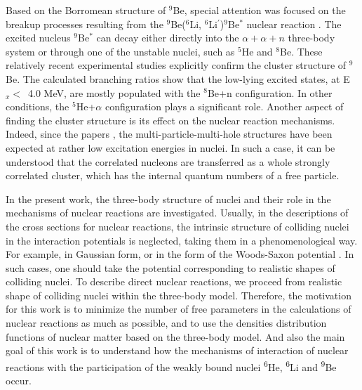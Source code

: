 \documentclass[
12pt, %
oneside, %
english, %
onehalfspacing, %
onehalfspacing, %
headsepline, %
]{MastersDoctoralThesis} %
\newcommand{\he}{\textsuperscript{6}He\xspace}
\newcommand{\li}{\textsuperscript{6}Li\xspace}
\newcommand{\be}{\textsuperscript{9}Be\xspace}
\begin{document}
Based on the Borromean structure of ${}^9$Be, special attention was focused on the breakup processes resulting from the ${}^9$Be($^6$Li, ${}^6$Li$^\prime$)$^9$Be$^*$ nuclear reaction \cite{brown2007, papka2007}. The excited nucleus ${}^9$Be$^*$ can decay either directly into the $\alpha+\alpha+n$ three-body system or through one of the unstable nuclei, such as ${}^5$He and ${}^8$Be. These relatively recent experimental studies explicitly confirm the cluster structure of ${}^9$Be.
The calculated branching ratios show that the low-lying excited states, at E$_x <$~4.0 MeV, are mostly populated with the ${}^8$Be+n configuration. In other conditions, the ${}^5$He+$\alpha$ configuration plays a significant  role.
Another aspect of finding the cluster structure is its  effect on the nuclear reaction mechanisms. Indeed, since the papers \cite{detraz1970, detraz1974}, the multi-particle-multi-hole structures have been expected at rather low excitation energies in nuclei. In such a case, it can be understood that the correlated nucleons are transferred as a whole strongly correlated cluster, which has the internal quantum numbers of a free particle.

In the present work, the three-body structure of nuclei and their role in the mechanisms of nuclear reactions are investigated.
 Usually, in the descriptions of the cross sections for nuclear reactions, the intrinsic structure of colliding nuclei in the interaction potentials is neglected, taking them in a phenomenological way. 
 For example, in Gaussian form, or in the form of the Woods-Saxon potential \cite{oganessian1999dynamics}.
 In such cases, one should take the potential corresponding to realistic shapes of colliding nuclei.
 To describe direct nuclear reactions, we proceed from realistic shape of colliding nuclei within the three-body model.
 Therefore, the motivation for this work is to minimize the number of free parameters in the calculations of nuclear reactions as much as possible, and to use the densities distribution functions of nuclear matter based on the three-body model. And also the main goal of this work is to understand how the mechanisms of interaction of nuclear reactions with the participation of the weakly bound nuclei \he, \li and \be occur. 
\end{document}
